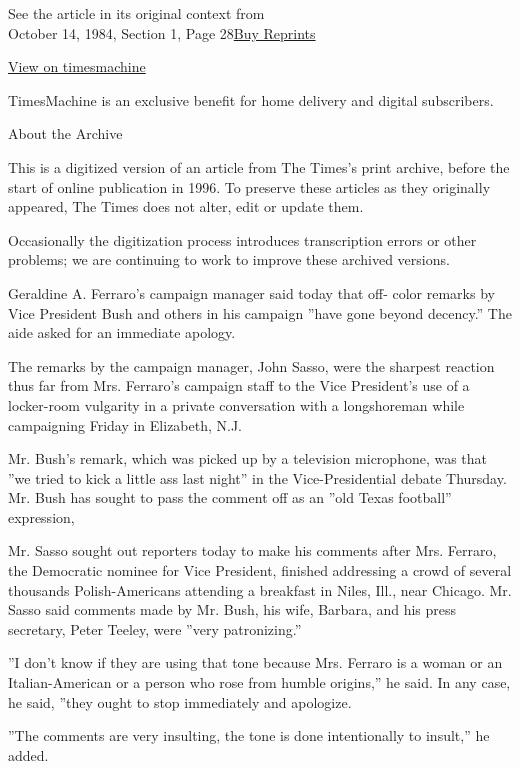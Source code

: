 See the article in its original context from\\
October 14, 1984, Section 1, Page
28\href{https://store.nytimes.com/collections/new-york-times-page-reprints?utm_source=nytimes\&utm_medium=article-page\&utm_campaign=reprints}{Buy
Reprints}

\href{http://timesmachine.nytimes.com/timesmachine/1984/10/14/010302.html}{View
on timesmachine}

TimesMachine is an exclusive benefit for home delivery and digital
subscribers.

About the Archive

This is a digitized version of an article from The Times's print
archive, before the start of online publication in 1996. To preserve
these articles as they originally appeared, The Times does not alter,
edit or update them.

Occasionally the digitization process introduces transcription errors or
other problems; we are continuing to work to improve these archived
versions.

Geraldine A. Ferraro's campaign manager said today that off- color
remarks by Vice President Bush and others in his campaign ''have gone
beyond decency.'' The aide asked for an immediate apology.

The remarks by the campaign manager, John Sasso, were the sharpest
reaction thus far from Mrs. Ferraro's campaign staff to the Vice
President's use of a locker-room vulgarity in a private conversation
with a longshoreman while campaigning Friday in Elizabeth, N.J.

Mr. Bush's remark, which was picked up by a television microphone, was
that ''we tried to kick a little ass last night'' in the
Vice-Presidential debate Thursday. Mr. Bush has sought to pass the
comment off as an ''old Texas football'' expression,

Mr. Sasso sought out reporters today to make his comments after Mrs.
Ferraro, the Democratic nominee for Vice President, finished addressing
a crowd of several thousands Polish-Americans attending a breakfast in
Niles, Ill., near Chicago. Mr. Sasso said comments made by Mr. Bush, his
wife, Barbara, and his press secretary, Peter Teeley, were ''very
patronizing.''

''I don't know if they are using that tone because Mrs. Ferraro is a
woman or an Italian-American or a person who rose from humble origins,''
he said. In any case, he said, ''they ought to stop immediately and
apologize.

''The comments are very insulting, the tone is done intentionally to
insult,'' he added.

